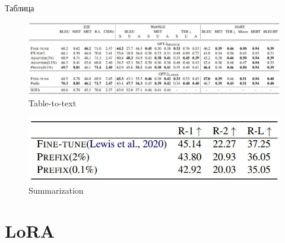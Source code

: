 \documentclass[9pt]{beamer}
\begin{document}
\begin{frame}{Таблица}

    \begin{figure}
        \label{prefix:table-to-text}
        \caption{Table-to-text}
        \begin{center}
            \includegraphics[scale=0.27]{images/prefix_2.jpg}
        \end{center}
    \end{figure}

    \begin{figure}
        \label{prefix:summarization}
        \caption{Summarization}
        \begin{center}
            \includegraphics[scale=0.3]{images/prefix_3.jpg}
        \end{center}
    \end{figure}

\end{frame}

\section{LoRA}
\end{document}

